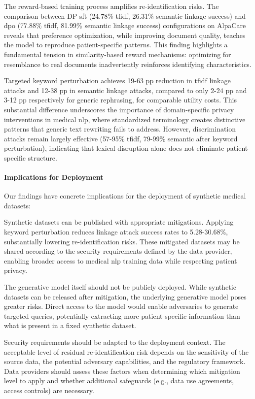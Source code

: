 The reward-based training process amplifies re-identification risks. The comparison between DP-\gls{sft} (24.78\% \gls{tfidf}, 26.31\% semantic linkage success) and \gls{dpo} (77.88\% \gls{tfidf}, 81.99\% semantic linkage success) configurations on AlpaCare reveals that preference optimization, while improving document quality, teaches the model to reproduce patient-specific patterns. This finding highlights a fundamental tension in similarity-based reward mechanisms: optimizing for resemblance to real documents inadvertently reinforces identifying characteristics.

Targeted keyword perturbation achieves 19-63 pp reduction in \gls{tfidf} linkage attacks and 12-38 pp in semantic linkage attacks, compared to only 2-24 pp and 3-12 pp respectively for generic rephrasing, for comparable utility costs. This substantial difference underscores the importance of domain-specific privacy interventions in medical \gls{nlp}, where standardized terminology creates distinctive patterns that generic text rewriting fails to address. However, discrimination attacks remain largely effective (57-95\% \gls{tfidf}, 79-99\% semantic after keyword perturbation), indicating that lexical disruption alone does not eliminate patient-specific structure.

\paragraph{Implications for Deployment}

Our findings have concrete implications for the deployment of synthetic medical datasets:

Synthetic datasets can be published with appropriate mitigations. Applying keyword perturbation reduces linkage attack success rates to 5.28-30.68\%, substantially lowering re-identification risks. These mitigated datasets may be shared according to the security requirements defined by the data provider, enabling broader access to medical \gls{nlp} training data while respecting patient privacy.

The generative model itself should not be publicly deployed. While synthetic datasets can be released after mitigation, the underlying generative model poses greater risks. Direct access to the model would enable adversaries to generate targeted queries, potentially extracting more patient-specific information than what is present in a fixed synthetic dataset.

Security requirements should be adapted to the deployment context. The acceptable level of residual re-identification risk depends on the sensitivity of the source data, the potential adversary capabilities, and the regulatory framework. Data providers should assess these factors when determining which mitigation level to apply and whether additional safeguards (e.g., data use agreements, access controls) are necessary.

